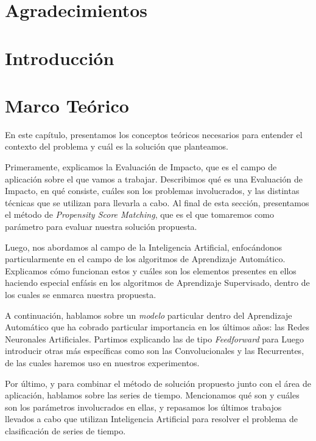 \documentclass[a4paper,12pt,spanish]{book}
\begin{document}


\cleardoublepage


\clearpage

\thispagestyle{empty}
\chapter*{Agradecimientos}
\clearpage

\tableofcontents
\clearpage

\chapter{Introducción}


\chapter{Marco Teórico}
En este capítulo, presentamos los conceptos teóricos necesarios para entender el contexto
del problema y cuál es la solución que planteamos.

Primeramente, explicamos la Evaluación de Impacto, que es el campo de aplicación sobre
el que vamos a trabajar. Describimos qué es una Evaluación de Impacto, en qué consiste,
cuáles son los problemas involucrados, y las distintas técnicas que se utilizan para
llevarla a cabo. Al final de esta sección, presentamos el método de \textit{Propensity Score Matching},
que es el que tomaremos como parámetro para evaluar nuestra solución propuesta.

Luego, nos abordamos al campo de la Inteligencia Artificial, enfocándonos particularmente
en el campo de los algoritmos de Aprendizaje Automático. Explicamos cómo funcionan estos y
cuáles son los elementos presentes en ellos haciendo especial enfásis en los algoritmos
de Aprendizaje Supervisado, dentro de los cuales se enmarca nuestra propuesta.

A continuación, hablamos sobre un \textit{modelo} particular dentro del Aprendizaje
Automático que ha cobrado particular importancia en los últimos años: las Redes
Neuronales Artificiales. Partimos explicando las de tipo \textit{Feedforward} para Luego
introducir otras más específicas como son las Convolucionales y las Recurrentes, de las
cuales haremos uso en nuestros experimentos.

Por último, y para combinar el método de solución propuesto junto con el área de aplicación,
hablamos sobre las series de tiempo. Mencionamos qué son y cuáles son los parámetros
involucrados en ellas, y repasamos los últimos trabajos llevados a cabo que utilizan
Inteligencia Artificial para resolver el problema de clasificación de series de tiempo.
\end{document}
